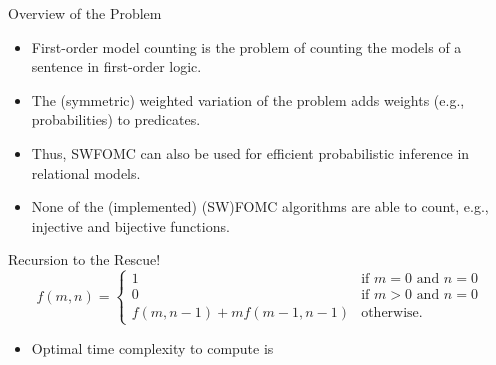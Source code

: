 \documentclass{beamer}
\begin{document}
\begin{frame}{Overview of the Problem}
  \begin{itemize}
  \item \alert{First-order model counting} is the problem of counting the models of a sentence in first-order logic.
  \item The \alert{(symmetric) weighted} variation of the problem adds weights (e.g., probabilities) to predicates.
  \item Thus, SWFOMC can also be used for efficient \alert{probabilistic inference} in relational models.
  \item None of the (implemented) (SW)FOMC algorithms are able to count, e.g., \alert{injective} and \alert{bijective} functions.
  \end{itemize}
\end{frame}

\begin{frame}{Recursion to the Rescue!}
  \[
  f(m, n) =
  \begin{cases}
    1 & \text{if } m = 0 \text{ and } n = 0 \\
    0 & \text{if } m > 0 \text{ and } n = 0 \\
    f(m, n-1) + mf(m-1, n-1) & \text{otherwise.}
  \end{cases}
  \]
  \begin{itemize}
  \item Optimal time complexity to compute  is 
  \end{itemize}
\end{frame}
\end{document}
